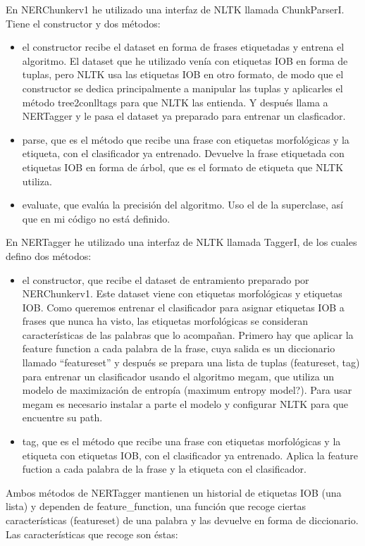 \documentclass{pre-tfg}
\begin{document}
En NERChunkerv1 he utilizado una interfaz de NLTK llamada ChunkParserI. Tiene el constructor y dos métodos:
\begin{itemize}
	\item el constructor recibe el dataset en forma de frases etiquetadas y entrena el algoritmo. El dataset que he utilizado venía con etiquetas IOB en forma de tuplas, pero NLTK usa las etiquetas IOB en otro formato, de modo que el constructor se dedica principalmente a manipular las tuplas y aplicarles el método tree2conlltags para que NLTK las entienda. Y después llama a NERTagger y le pasa el dataset ya preparado para entrenar un clasficador.
	\item parse, que es el método que recibe una frase con etiquetas morfológicas y la etiqueta, con el clasificador ya entrenado. Devuelve la frase etiquetada con etiquetas IOB en forma de árbol, que es el formato de etiqueta que NLTK utiliza.
	\item evaluate, que evalúa la precisión del algoritmo. Uso el de la superclase, así que en mi código no está definido.
\end{itemize}


En NERTagger he utilizado una interfaz de NLTK llamada TaggerI, de los cuales defino dos métodos:

\begin{itemize}
	\item el constructor, que recibe el dataset de entramiento preparado por NERChunkerv1. Este dataset viene con etiquetas morfológicas y etiquetas IOB. Como queremos entrenar el clasificador para asignar etiquetas IOB a frases que nunca ha visto, las etiquetas morfológicas se consideran características de las palabras que lo acompañan. Primero hay que aplicar la feature function a cada palabra de la frase, cuya salida es un diccionario llamado “featureset” y después se prepara una lista de tuplas (featureset, tag) para entrenar un clasificador usando el algoritmo megam, que utiliza un modelo de maximización de entropía (maximum entropy model?). Para usar megam es necesario instalar a parte el modelo y configurar NLTK para que encuentre su path.
	\item tag, que es el método que recibe una frase con etiquetas morfológicas y la etiqueta con etiquetas IOB, con el clasificador ya entrenado. Aplica la feature fuction a cada palabra de la frase y la etiqueta con el clasificador.
\end{itemize}

Ambos métodos de NERTagger mantienen un historial de etiquetas IOB (una lista) y dependen de feature\_function, una función que recoge ciertas características (featureset) de una palabra y las devuelve en forma de diccionario. Las características que recoge son éstas:
\end{document}

